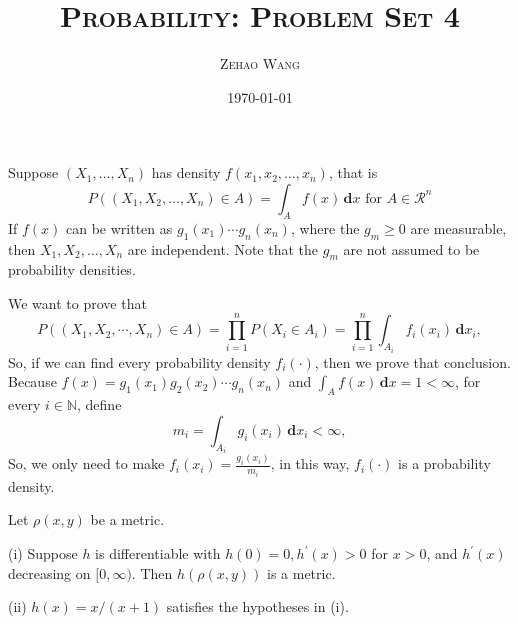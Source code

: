 \documentclass[en, normal, 11pt, black]{elegantnote}
\title{\textsc{Probability: Problem Set 4}}
\author{\textsc{Zehao Wang}}
\date{\today}
\newenvironment{exercise}[1]{\begin{tcolorbox}[colback=black!15, colframe=black!80, breakable, title=#1]}{\end{tcolorbox}}
\renewenvironment{proof}{\begin{tcolorbox}[colback=white, colframe=black!50, breakable, title=Proof. ]\setlength{\parskip}{0.8em}}{\,\\\rightline{$\square$}\end{tcolorbox}}
\newcommand{\der}{\,\mathbf{d}}
\begin{document}
    \maketitle

    \begin{exercise}{2.1.1}
        Suppose $\left(X_{1}, \ldots, X_{n}\right)$ has density $f\left(x_{1}, x_{2}, \ldots, x_{n}\right)$, that is
        \[
        P\left(\left(X_{1}, X_{2}, \ldots, X_{n}\right) \in A\right)=\int_{A} f(x) \der x \text { for } A \in \mathcal{R}^{n}
        \]
        If $f(x)$ can be written as $g_{1}\left(x_{1}\right) \cdots g_{n}\left(x_{n}\right)$, where the $g_{m} \geqslant 0$ are measurable, then $X_{1}, X_{2}, \ldots, X_{n}$ are independent. Note that the $g_{m}$ are not assumed to be probability densities. 
    \end{exercise}

    \begin{proof}
        We want to prove that 
        \[
            P((X_1,X_2,\cdots,X_n)\in A)=\prod_{i=1}^nP(X_i\in A_i)=\prod_{i=1}^n\int_{A_i}f_i(x_i) \der x_i, 
        \]
        So, if we can find every probability density $f_i(\cdot)$, then we prove that conclusion. Because $f(x)=g_1(x_1)g_2(x_2)\cdots g_n(x_n)$ and $\int_Af(x)\der x=1<\infty$, for every $i\in \mathbb{N}$, define 
        \[
            m_i=\int_{A_i} g_i(x_i) \der x_i<\infty, 
        \]
        So, we only need to make $f_i(x_i)=\frac{g_i(x_i)}{m_i}$, in this way, $f_i(\cdot)$ is a probability density. 
    \end{proof}


    \begin{exercise}{2.1.3}
        Let $\rho(x, y)$ be a metric. 
        
        (i) Suppose $h$ is differentiable with $h(0)=0, h^{\prime}(x)>0$ for $x>0$, and $h^{\prime}(x)$ decreasing on $[0, \infty)$. Then $h(\rho(x, y))$ is a metric. 
        
        (ii) $h(x)=x /(x+1)$ satisfies the hypotheses in (i). 
    \end{exercise}
\end{document}
